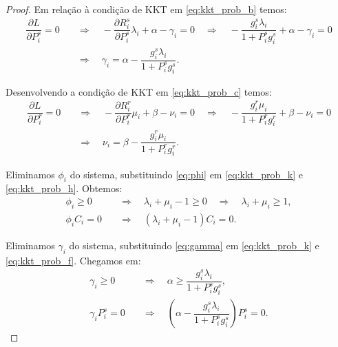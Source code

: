 \begin{proof}
    Em relação à condição de \ac{KKT} em \eqref{eq:kkt_prob_b} temos:
    \begin{equation}\label{eq:gamma}
    \begin{split}
            \dfrac{\partial L}{\partial P_i^s} = 0 \quad &\Rightarrow \quad -\dfrac{\partial R_i^s}{\partial P_i^s}\lambda_i +\alpha -\gamma_i = 0 \quad \Rightarrow \quad -\dfrac{g_i^s\lambda_i}{1 + P_i^sg_i^s} +\alpha -\gamma_i = 0  \\
            & \Rightarrow \quad \gamma_i = \alpha -\dfrac{g_i^s\lambda_i}{1 + P_i^sg_i^s}.
    \end{split}
    \end{equation}

    Desenvolvendo a condição de \ac{KKT} em \eqref{eq:kkt_prob_c} temos:
    \begin{equation}\label{eq:nu}
    \begin{split}
    \dfrac{\partial L}{\partial P_i^r} = 0 \quad &\Rightarrow \quad -\dfrac{\partial R_i^r}{\partial P_i^r}\mu_i +\beta -\nu_i  = 0\quad \Rightarrow \quad -\dfrac{g_i^r\mu_i}{1 + P_i^rg_i^r} +\beta -\nu_i = 0 \\
    &\Rightarrow \quad \nu_i = \beta -\dfrac{g_i^r\mu_i}{1 + P_i^rg_i^r}. 
    \end{split}
    \end{equation}

    Eliminamos $\phi_i$ do sistema, substituindo \eqref{eq:phi} em \eqref{eq:kkt_prob_k} e \eqref{eq:kkt_prob_h}. Obtemos:
    \begin{subequations}
            \begin{align}
                    \phi_i \geq 0 \quad &\Rightarrow \quad \lambda_i + \mu_i - 1 \geq 0 \quad \Rightarrow \quad \lambda_i + \mu_i \geq 1, \\
                    \phi_i C_i = 0 \quad &\Rightarrow \quad (\lambda_i + \mu_i - 1) C_i = 0.
            \end{align}
    \end{subequations}

    Eliminamos $\gamma_i$ do sistema, substituindo \eqref{eq:gamma} em \eqref{eq:kkt_prob_k} e \eqref{eq:kkt_prob_f}. Chegamos em:
    \begin{subequations}
            \begin{align}
                    \gamma_i \geq 0 \quad &\Rightarrow \quad \alpha \geq \dfrac{g_i^s\lambda_i}{1 + P_i^sg_i^s}, \\
                    \gamma_i P_i^s = 0 \quad &\Rightarrow \quad \left(\alpha -\dfrac{g_i^s\lambda_i}{1 + P_i^sg_i^s}\right) P_i^s = 0.
            \end{align}
    \end{subequations}


\end{proof}

